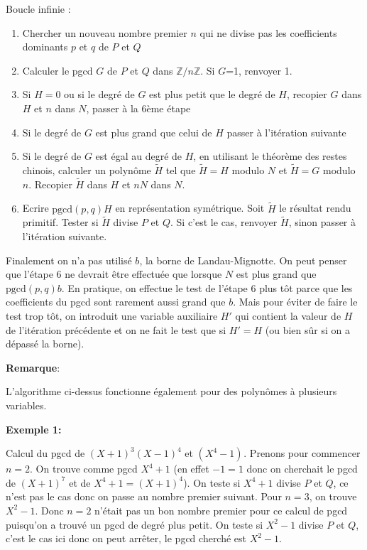 \documentclass[a4paper,11pt]{article}
\begin{document}
Boucle infinie :
\begin{enumerate}
  \item Chercher un nouveau nombre premier $n$ qui ne divise pas les
  coefficients dominants $p$ et $q$ de $P$ et $Q$
  
  \item Calculer le pgcd $G$ de $P$ et $Q$ dans $\mathbb{Z} / n \mathbb{Z}$.
  Si $G$=1, renvoyer 1.
  
  \item Si $H = 0$ ou si le degré de $G$ est plus petit que le degré
  de $H$, recopier $G$ dans $H$ et $n$ dans $N$, passer à la 6ème étape
  
  \item Si le degré de $G$ est plus grand que celui de $H$ passer à
  l'itération suivante
  
  \item Si le degré de $G$ est égal au degré de $H$, 
  en utilisant le théorème des restes chinois, calculer un polynôme
  $\tilde{H}$ tel que $\tilde{H} = H$ modulo $N$ et $\tilde{H} = G$ modulo
  $n$. Recopier $\tilde{H}$ dans $H$ et $n N$ dans $N$.
  
  \item Ecrire $\mbox{pgcd} ( p, q ) H$ en représentation symétrique. Soit
  $\tilde{H}$ le résultat rendu primitif. Tester si $\tilde{H}$ divise $P$ et
  $Q$. Si c'est le cas, renvoyer $\tilde{H}$, sinon passer à l'itération
  suivante.
\end{enumerate}
Finalement on n'a pas utilisé $b$, la borne de Landau-Mignotte. 
On peut penser que l'étape
6 ne devrait être effectuée que lorsque $N$ est plus grand que $\mbox{pgcd} (
p, q ) b$. En pratique, on effectue le test de l'étape 6 plus tôt parce que
les coefficients du pgcd sont rarement aussi grand que $b$. Mais pour éviter
de faire le test trop tôt, on introduit une variable auxiliaire $H'$ qui
contient la valeur de $H$ de l'itération précédente et on ne fait le test que
si $H' = H$ (ou bien sûr si on a dépassé la borne).

{\bf{Remarque}}:

L'algorithme ci-dessus fonctionne également pour des polynômes à plusieurs
variables.

{\bf{Exemple 1:}}

Calcul du pgcd de $( X + 1 )^3 ( X - 1 )^4$ et $( X^4 - 1 )^{}$. Prenons pour
commencer $n = 2$. On trouve comme pgcd $X^4 + 1$ (en effet $- 1 = 1$ donc on
cherchait le pgcd de $( X + 1 )^7$ et de $X^4 + 1 = ( X + 1 )^4$). On teste si
$X^4 + 1$ divise $P$ et $Q$, ce n'est pas le cas donc on passe au nombre
premier suivant. Pour $n = 3$, on trouve $X^2 - 1$. Donc $n = 2$ n'était pas un
bon nombre premier pour ce calcul de pgcd puisqu'on a trouvé un pgcd de degré
plus petit. On teste si $X^2 - 1$ divise $P$ et $Q$, c'est le cas ici donc on
peut arrêter, le pgcd cherché est $X^2-1$.
\end{document}
